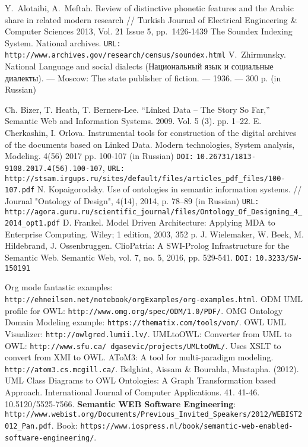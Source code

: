 \documentclass[conference,a4paper]{IEEEtran}
\providecommand\url[1]{\texttt{#1}}
\begin{document}
\begin{thebibliography}{11}
 Y.~Alotaibi, A.~Meftah. Review of distinctive phonetic features and the Arabic share in related modern research // Turkish Journal of Electrical Engineering \& Computer Sciences 2013, Vol. 21 Issue 5, pp.~1426-1439
	The Soundex Indexing System. National archives. \texttt{URL:} \url{http://www.archives.gov/research/census/soundex.html}
 V.~Zhirmunsky. National Language and social dialects (Национальный язык и социальные диалекты). --- Moscow: The state publisher of fiction. --- 1936. --- 300 p. (in Russian)





 Ch. Bizer, T. Heath, T. Berners-Lee. ``Linked Data – The Story So Far,'' Semantic Web and Information Systems. 2009. Vol. 5 (3). pp. 1–22.
 E. Cherkashin, I. Orlova. Instrumental tools for construction of the digital archives of the documents based on Linked Data. Modern technologies, System analysis, Modeling. 4(56) 2017 pp. 100-107 (in Russian) \texttt{DOI:} \url{10.26731/1813-9108.2017.4(56).100-107}, \texttt{URL:} \url{http://stsam.irgups.ru/sites/default/files/articles\_pdf\_files/100-107.pdf}
 N. Kopaigorodsky. Use of ontologies in semantic information systems. // Journal "Ontology of Design", 4(14), 2014, p. 78--89 (in Russian) \texttt{URL:} \url{http://agora.guru.ru/scientific\_journal/files/Ontology\_Of\_Designing\_4\_2014\_opt1.pdf}
 D. Frankel. Model Driven Architecture: Applying MDA to Enterprise Computing. Wiley; 1 edition, 2003, 352 p.
  J. Wielemaker, W. Beek, M. Hildebrand, J. Ossenbruggen. ClioPatria: A SWI-Prolog Infrastructure for the Semantic Web. Semantic Web, vol. 7, no. 5, 2016, pp. 529-541. \texttt{DOI:} \url{10.3233/SW-150191}

 Org mode fantastic examples: \url{http://ehneilsen.net/notebook/orgExamples/org-examples.html}.
 ODM UML profile for OWL: \url{http://www.omg.org/spec/ODM/1.0/PDF/}.
 OMG Ontology Domain Modeling example: \url{https://thematix.com/tools/vom/}.
 OWL UML Visualizer: \url{http://owlgred.lumii.lv/}.
 UMLtoOWL: Converter from UML to OWL: \url{http://www.sfu.ca/~dgasevic/projects/UMLtoOWL/}. Uses XSLT to convert from XMI to OWL.
 AToM3: A tool for multi-paradigm modeling. \url{http://atom3.cs.mcgill.ca/}.
 Belghiat, Aissam \& Bourahla, Mustapha. (2012). UML Class Diagrams to OWL Ontologies: A Graph Transformation based Approach. International Journal of Computer Applications. 41. 41-46. 10.5120/5525-7566.
 \textbf{Semantic WEB Software Engineering}: \url{http://www.webist.org/Documents/Previous\_Invited\_Speakers/2012/WEBIST2012\_Pan.pdf}. Book: \url{https://www.iospress.nl/book/semantic-web-enabled-software-engineering/}.
\end{thebibliography}




\end{document}

